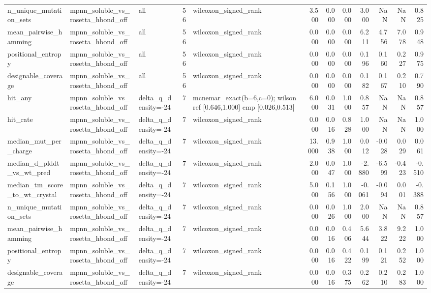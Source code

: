 \begin{table}
{\begin{tabular}{lllrlrrrrrrr}
n\_unique\_mutation\_sets & mpnn\_soluble\_vs\_rosetta\_hbond\_off & all & 56 & wilcoxon\_signed\_rank & 3.500 & 0.000 & 0.000 & 3.000 & NaN & NaN & 0.825 \\
mean\_pairwise\_hamming & mpnn\_soluble\_vs\_rosetta\_hbond\_off & all & 56 & wilcoxon\_signed\_rank & 0.000 & 0.000 & 0.000 & 6.211 & 4.756 & 7.078 & 0.948 \\
positional\_entropy & mpnn\_soluble\_vs\_rosetta\_hbond\_off & all & 56 & wilcoxon\_signed\_rank & 0.000 & 0.000 & 0.000 & 0.196 & 0.160 & 0.227 & 0.975 \\
designable\_coverage & mpnn\_soluble\_vs\_rosetta\_hbond\_off & all & 56 & wilcoxon\_signed\_rank & 0.000 & 0.000 & 0.000 & 0.182 & 0.167 & 0.210 & 0.790 \\
hit\_any & mpnn\_soluble\_vs\_rosetta\_hbond\_off & delta\_q\_density=-24 & 7 & mcnemar\_exact(b=6,c=0); wilson ref [0.646,1.000] cmp [0.026,0.513] & 6.000 & 0.031 & 1.000 & 0.857 & NaN & NaN & 0.857 \\
hit\_rate & mpnn\_soluble\_vs\_rosetta\_hbond\_off & delta\_q\_density=-24 & 7 & wilcoxon\_signed\_rank & 0.000 & 0.016 & 0.828 & 1.000 & NaN & NaN & 1.000 \\
median\_mut\_per\_charge & mpnn\_soluble\_vs\_rosetta\_hbond\_off & delta\_q\_density=-24 & 7 & wilcoxon\_signed\_rank & 13.000 & 0.938 & 1.000 & 0.012 & -0.028 & 0.029 & 0.061 \\
median\_d\_plddt\_vs\_wt\_pred & mpnn\_soluble\_vs\_rosetta\_hbond\_off & delta\_q\_density=-24 & 7 & wilcoxon\_signed\_rank & 2.000 & 0.047 & 1.000 & -2.880 & -6.599 & -0.423 & -0.510 \\
median\_tm\_score\_to\_wt\_crystal & mpnn\_soluble\_vs\_rosetta\_hbond\_off & delta\_q\_density=-24 & 7 & wilcoxon\_signed\_rank & 5.000 & 0.156 & 1.000 & -0.061 & -0.094 & 0.001 & -0.388 \\
n\_unique\_mutation\_sets & mpnn\_soluble\_vs\_rosetta\_hbond\_off & delta\_q\_density=-24 & 7 & wilcoxon\_signed\_rank & 0.000 & 0.026 & 1.000 & 2.000 & NaN & NaN & 0.857 \\
mean\_pairwise\_hamming & mpnn\_soluble\_vs\_rosetta\_hbond\_off & delta\_q\_density=-24 & 7 & wilcoxon\_signed\_rank & 0.000 & 0.016 & 0.406 & 5.644 & 3.822 & 9.222 & 1.000 \\
positional\_entropy & mpnn\_soluble\_vs\_rosetta\_hbond\_off & delta\_q\_density=-24 & 7 & wilcoxon\_signed\_rank & 0.000 & 0.016 & 0.422 & 0.199 & 0.121 & 0.252 & 1.000 \\
designable\_coverage & mpnn\_soluble\_vs\_rosetta\_hbond\_off & delta\_q\_density=-24 & 7 & wilcoxon\_signed\_rank & 0.000 & 0.016 & 0.375 & 0.262 & 0.210 & 0.283 & 1.000 \\

\end{tabular}}
\end{table}
